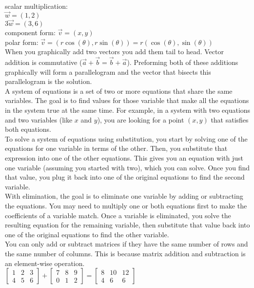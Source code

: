 \documentclass{article}
\begin{document}
scalar multiplication:\\
$\vec{w} = (1 , 2)$\\
$3\vec{w} = (3, 6)$\\

component form: $\vec{v} = (x, y)$\\
polar form: $\vec{v} = (r\cos(\theta), r\sin(\theta)) = r(\cos(\theta), \sin(\theta))$\\

When you graphically add two vectors you add them tail to head. Vector addition is commutative ($\vec{a} + \vec{b} = \vec{b} + \vec{a}$). Preforming both of these additions graphically will form a parallelogram and the vector that bisects this parallelogram is the solution.\\ 

A system of equations is a set of two or more equations that share the same variables. The goal is to find values for those variable that make all the equations in the system true at the same time. For example, in a system with two equations and two variables (like $x$ and $y$), you are looking for a point $(x, y)$ that satisfies both equations.\\

To solve a system of equations using substitution, you start by solving one of the equations for one variable in terms of the other. Then, you substitute that expression into one of the other equations. This gives you an equation with just one variable (assuming you started with two), which you can solve. Once you find that value, you plug it back into one of the original equations to find the second variable.\\

With elimination, the goal is to eliminate one variable by adding or subtracting the equations. You may need to multiply one or both equations first to make the coefficients of a variable match. Once a variable is eliminated, you solve the resulting equation for the remaining variable, then substitute that value back into one of the original equations to find the other variable.\\

You can only add or subtract matrices if they have the same number of rows and the same number of columns. This is because matrix addition and subtraction is an element-wise operation.\\

$
\begin{bmatrix}
	1 & 2 & 3\\
	4 & 5 & 6
\end{bmatrix}
+
\begin{bmatrix}
	7 & 8 & 9\\
	0 & 1 & 2
\end{bmatrix}
=
\begin{bmatrix}
	8 & 10 & 12\\
	4 & 6 & 6
\end{bmatrix}
$\\\\
\end{document}
